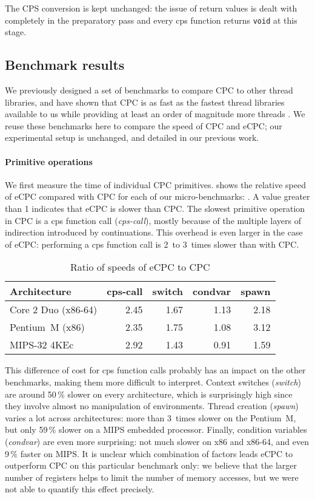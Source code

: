 \documentclass[a4paper]{llncs}
\begin{document}
The CPS conversion is kept unchanged: the issue of return values is dealt with
completely in the preparatory pass and every cps function returns \texttt{void} at
this stage.


\subsection{Benchmark results}
\label{sec:ecpc-bench}

We previously designed a set of benchmarks to compare CPC to other thread
libraries, and have shown that CPC is as fast as the fastest thread libraries
available to us while providing at least an order of magnitude more threads
\cite{kerneis2011}.  We reuse these benchmarks here to compare the speed of CPC
and eCPC; our experimental setup is unchanged, and detailed in our previous
work.

\paragraph{Primitive operations}

We first measure the time of individual CPC primitives.   shows
the relative speed of eCPC compared with CPC for each of our micro-benchmarks:
.  A value greater than 1 indicates that eCPC
is slower than CPC.  The slowest primitive operation in CPC is a cps function
call (\emph{cps-call}), mostly because of the multiple layers of indirection
introduced by continuations.  This overhead is even larger in the case of eCPC:
performing a cps function call is 2~to 3~times slower than with CPC.
\begin{table}[htb]
\caption{Ratio of speeds of eCPC to CPC}
\centering
\begin{tabular}{lrrrr}
\toprule
Architecture          & cps-call & switch & condvar & spawn
\tabularnewline
\midrule
Core 2 Duo (x86-64)   &    2.45  & 1.67   & 1.13    & 2.18   \\
  Pentium~M (x86)  &  2.35 & 1.75  & 1.08  & 3.12  \\
   MIPS-32 4KEc  &  2.92 & 1.43  & 0.91  & 1.59  \\
\bottomrule
\end{tabular}
\label{tab:speed}
\end{table}

This difference of cost for cps function calls probably has an impact on the
other benchmarks, making them more difficult to interpret.  Context switches
(\emph{switch}) are around 50\,\% slower on every architecture, which is
surprisingly high since they involve almost no manipulation of environments.
Thread creation (\emph{spawn}) varies a lot across architectures: more than
3~times slower on the Pentium~M, but only 59\,\% slower on a MIPS embedded
processor.  Finally, condition variables (\emph{condvar}) are even more
surprising: not much slower on x86 and x86-64, and even 9\,\% faster on MIPS.
It is unclear which combination of factors leads eCPC to outperform CPC on this
particular benchmark only: we believe that the larger number of registers helps
to limit the number of memory accesses, but we were not able to quantify this
effect precisely.
\end{document}
